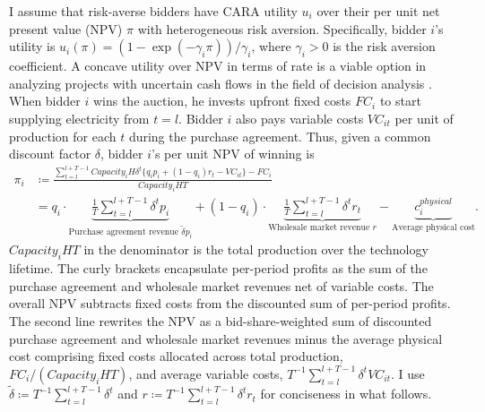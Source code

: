 \documentclass[12pt]{article}
\theoremstyle{definition} %
\begin{document}
I assume that risk-averse bidders have CARA utility $u_i$ over their per unit net present value (NPV) $\pi$ with heterogeneous risk aversion. Specifically, bidder $i$'s utility is $u_i(\pi) = (1 - \exp(-\gamma_i \pi))/\gamma_i $, where $\gamma_i > 0 $ is the risk aversion coefficient. A concave utility over NPV in terms of rate is a viable option in analyzing projects with uncertain cash flows in the field of decision analysis \citep{Hazen2009}. When bidder $i$ wins the auction, he invests upfront fixed costs $FC_i $ to start supplying electricity from $t = l $. Bidder $i$ also pays variable costs $VC_{it} $ per unit of production for each $t$ during the purchase agreement. Thus, given a common discount factor $\delta $, bidder $i$'s per unit NPV of winning is
\begin{align*}
\pi_i &\coloneqq \frac{\sum_{t=l}^{l+T-1} Capacity_i H \delta^t \{q_i p_i + (1-q_i) r_t - VC_{it} \} - FC_i}{Capacity_i H T} \\
&= q_i \cdot \underbrace{\frac{1}{T} \sum_{t=l}^{l+T-1}\delta^t p_i}_{\text{Purchase agreement revenue $\tilde{\delta}p_i$}} + (1-q_i) \cdot \underbrace{\frac{1}{T} \sum_{t=l}^{l+T-1} \delta^t r_t}_{\text{Wholesale market revenue $r$}} - \underbrace{c_i^{physical}}_{\text{Average physical cost}}.
\end{align*}
$Capacity_i H T$ in the denominator is the total production over the technology lifetime. The curly brackets encapsulate per-period profits as the sum of the purchase agreement and wholesale market revenues net of variable costs. The overall NPV subtracts fixed costs from the discounted sum of per-period profits. The second line rewrites the NPV as a bid-share-weighted sum of discounted purchase agreement and wholesale market revenues minus the average physical cost comprising fixed costs allocated across total production, $FC_i/(Capacity_iHT)$, and average variable costs, $T^{-1}\sum_{t=l}^{l+T-1}\delta^tVC_{it}$. I use $\tilde{\delta} \coloneqq T^{-1} \sum_{t=l}^{l+T-1} \delta^t $ and $r \coloneqq T^{-1} \sum_{t=l}^{l+T-1} \delta^t r_t$ for conciseness in what follows.
\end{document}
